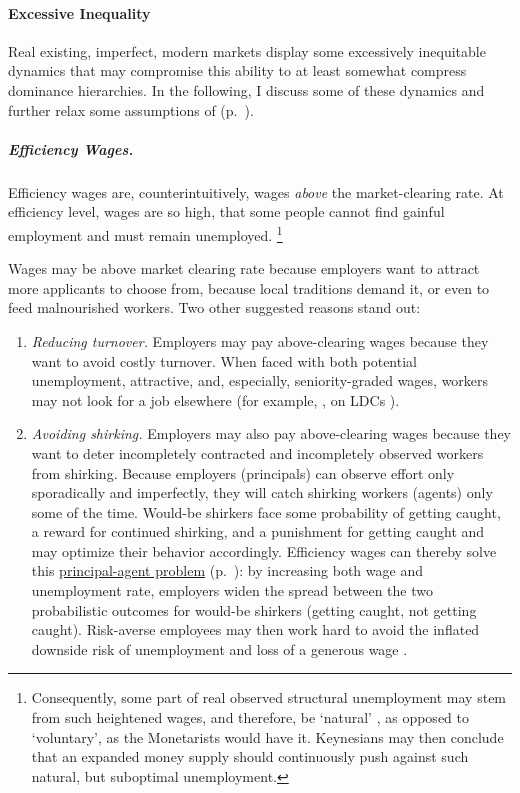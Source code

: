 \paragraph{Excessive Inequality} \label{sec:inequality-dynamics} Real existing, imperfect, modern markets display some excessively inequitable dynamics that may compromise this ability to at least somewhat compress dominance hierarchies.
In the following, I discuss some of these dynamics and further relax some assumptions of   (p.~\pageref{sec:perfect-competition}).

\subparagraph[Efficiency Wages]{Efficiency Wages.}  \label{sec:efficiency-wages} Efficiency wages are, counterintuitively, wages \emph{above} the market-clearing rate.
At efficiency level, wages are so high, that some people cannot find gainful employment and must remain unemployed.
\footnote{
	Consequently, some part of real observed structural unemployment may stem from such heightened wages, and therefore, be `natural' \citep{Schlicht1978}, as opposed to `voluntary', as the Monetarists would have it.
	Keynesians may then conclude that an expanded money supply should continuously push against such natural, but suboptimal unemployment.
}

Wages may be above market clearing rate because employers want to attract more applicants to choose from, because local traditions demand it, or even to feed malnourished workers.
Two other suggested reasons stand out:

\begin{enumerate}
	\item \emph{Reducing turnover.} Employers may pay above-clearing wages because they want to avoid costly turnover.
When faced with both potential unemployment, attractive, and, especially, seniority-graded wages, workers may not look for a job elsewhere (for example, \citealt{Salop1979}, on \glspl{LDC} \citealt{Stiglitz1974a}).
	\item \emph{Avoiding shirking.} Employers may also pay above-clearing wages because they want to deter incompletely contracted and incompletely observed workers from shirking.
Because employers (principals) can observe effort only sporadically and imperfectly, they will catch shirking workers (agents) only some of the time.
Would-be shirkers face some probability of getting caught, a reward for continued shirking, and a punishment for getting caught and may optimize their behavior accordingly.
Efficiency wages can thereby solve this \hyperref[sec:principal-agent-problem]{principal-agent problem} (p.~\pageref{sec:principal-agent-problem}):
by increasing both wage and unemployment rate, employers widen the spread between the two probabilistic outcomes for would-be shirkers (getting caught, not getting caught).
Risk-averse employees may then work hard to avoid the inflated downside risk of unemployment and loss of a generous wage \citep{Stiglitz1984}.
\end{enumerate}

